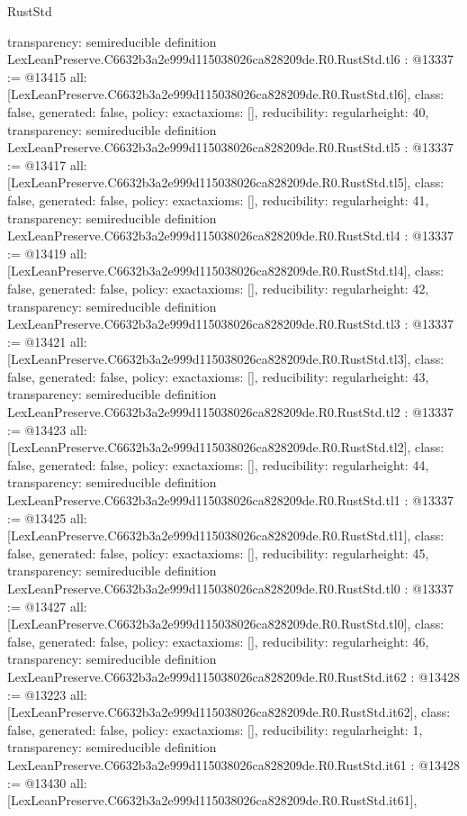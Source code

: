 \begin{lexlean}{RustStd}
\begin{coremodule}
{  transparency: semireducible
}
definition LexLeanPreserve.C6632b3a2e999d115038026ca828209de.R0.RustStd.tl6 : @13337 := @13415 {
  all: [LexLeanPreserve.C6632b3a2e999d115038026ca828209de.R0.RustStd.tl6],
  class: false,
  generated: false,
  policy: exact{axioms: []},
  reducibility: regular{height: 40},
  transparency: semireducible
}
definition LexLeanPreserve.C6632b3a2e999d115038026ca828209de.R0.RustStd.tl5 : @13337 := @13417 {
  all: [LexLeanPreserve.C6632b3a2e999d115038026ca828209de.R0.RustStd.tl5],
  class: false,
  generated: false,
  policy: exact{axioms: []},
  reducibility: regular{height: 41},
  transparency: semireducible
}
definition LexLeanPreserve.C6632b3a2e999d115038026ca828209de.R0.RustStd.tl4 : @13337 := @13419 {
  all: [LexLeanPreserve.C6632b3a2e999d115038026ca828209de.R0.RustStd.tl4],
  class: false,
  generated: false,
  policy: exact{axioms: []},
  reducibility: regular{height: 42},
  transparency: semireducible
}
definition LexLeanPreserve.C6632b3a2e999d115038026ca828209de.R0.RustStd.tl3 : @13337 := @13421 {
  all: [LexLeanPreserve.C6632b3a2e999d115038026ca828209de.R0.RustStd.tl3],
  class: false,
  generated: false,
  policy: exact{axioms: []},
  reducibility: regular{height: 43},
  transparency: semireducible
}
definition LexLeanPreserve.C6632b3a2e999d115038026ca828209de.R0.RustStd.tl2 : @13337 := @13423 {
  all: [LexLeanPreserve.C6632b3a2e999d115038026ca828209de.R0.RustStd.tl2],
  class: false,
  generated: false,
  policy: exact{axioms: []},
  reducibility: regular{height: 44},
  transparency: semireducible
}
definition LexLeanPreserve.C6632b3a2e999d115038026ca828209de.R0.RustStd.tl1 : @13337 := @13425 {
  all: [LexLeanPreserve.C6632b3a2e999d115038026ca828209de.R0.RustStd.tl1],
  class: false,
  generated: false,
  policy: exact{axioms: []},
  reducibility: regular{height: 45},
  transparency: semireducible
}
definition LexLeanPreserve.C6632b3a2e999d115038026ca828209de.R0.RustStd.tl0 : @13337 := @13427 {
  all: [LexLeanPreserve.C6632b3a2e999d115038026ca828209de.R0.RustStd.tl0],
  class: false,
  generated: false,
  policy: exact{axioms: []},
  reducibility: regular{height: 46},
  transparency: semireducible
}
definition LexLeanPreserve.C6632b3a2e999d115038026ca828209de.R0.RustStd.it62 : @13428 := @13223 {
  all: [LexLeanPreserve.C6632b3a2e999d115038026ca828209de.R0.RustStd.it62],
  class: false,
  generated: false,
  policy: exact{axioms: []},
  reducibility: regular{height: 1},
  transparency: semireducible
}
definition LexLeanPreserve.C6632b3a2e999d115038026ca828209de.R0.RustStd.it61 : @13428 := @13430 {
  all: [LexLeanPreserve.C6632b3a2e999d115038026ca828209de.R0.RustStd.it61],
}
\end{coremodule}
\end{lexlean}
